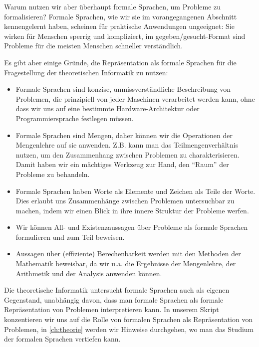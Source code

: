 Warum nutzen wir aber überhaupt formale Sprachen,
um Probleme zu formalisieren?
Formale Sprachen,
wie wir sie im vorangegangenen Abschnitt kennengelernt haben,
scheinen für praktische Anwendungen ungeeignet:
Sie wirken für Menschen sperrig und kompliziert,
im gegeben/gesucht-Format sind Probleme für die meisten Menschen schneller verständlich.

Es gibt aber einige Gründe,
die Repräsentation als formale Sprachen
für die Fragestellung der theoretischen Informatik zu nutzen:
\begin{itemize}
    \item Formale Sprachen sind konzise, unmissverständliche Beschreibung von Problemen,
        die prinzipiell von jeder Maschinen verarbeitet werden kann,
        ohne dass wir uns auf eine bestimmte Hardware-Architektur oder Programmiersprache
        festlegen müssen.
    \item Formale Sprachen sind Mengen, daher können wir die Operationen der Mengenlehre
        auf sie anwenden.
        Z.B. kann man das Teilmengenverhältnis nutzen,
        um den Zusammenhang zwischen Problemen zu charakterisieren.
        Damit haben wir ein mächtiges Werkzeug zur Hand,
        den ``Raum'' der Probleme zu behandeln.
    \item Formale Sprachen haben Worte als Elemente und Zeichen als Teile der Worte.
        Dies erlaubt uns Zusammenhänge zwischen Problemen untersuchbar zu machen,
        indem wir einen Blick in ihre innere Struktur der Probleme werfen.  
    \item Wir können All- und Existenzaussagen über Probleme als formale Sprachen formulieren
        und zum Teil beweisen.
    \item Aussagen über (effiziente) Berechenbarkeit werden mit den Methoden der Mathematik
        beweisbar, da wir u.a. die Ergebnisse der Mengenlehre, der Arithmetik
        und der Analysis anwenden können.
\end{itemize}

Die theoretische Informatik untersucht formale Sprachen auch als eigenen Gegenstand,
unabhängig davon, dass man formale Sprachen als formale Repräsentation von Problemen
interpretieren kann.
In unserem Skript konzentieren wir uns auf die Rolle von formalen Sprachen als
Repräsentation von Problemen,
in \autoref{ch:theorie} werden wir Hinweise durchgehen,
wo man das Studium der formalen Sprachen vertiefen kann.



